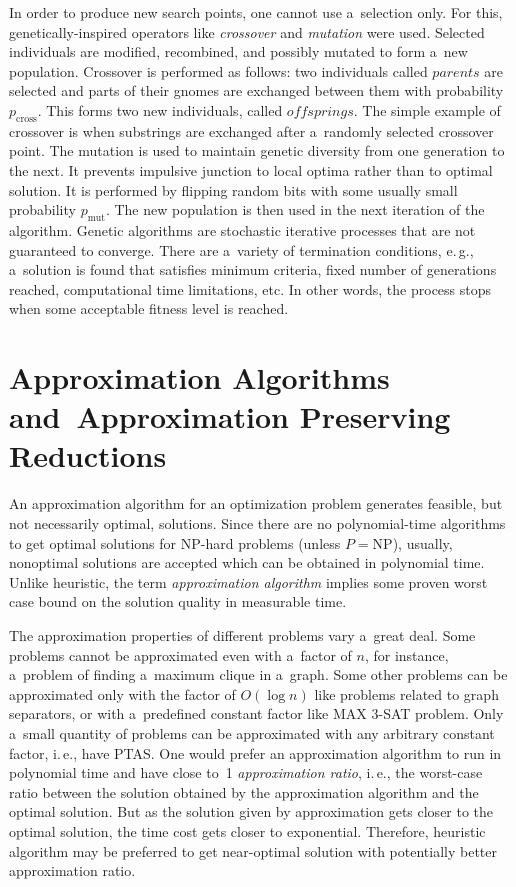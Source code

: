\begin{multicols}{2}
In order to produce new search points, one cannot use a~selection
only. For this, genetically-inspired operators like
\textit{crossover} and \textit{mutation} were used. Selected individuals are
modified, recombined, and possibly mutated to form a~new population.
Crossover is performed as follows: two individuals called
$\textit{parents}$ are selected and parts of their gnomes are
exchanged between them with probability $p_{\mathrm{cross}}$. This forms two
new individuals, called $\textit{offsprings}$. The simple example of
crossover is when substrings are exchanged after a~randomly selected
crossover point. The mutation is used to maintain genetic diversity
from one generation to the next. It prevents impulsive junction to
local optima rather than to optimal solution. It is performed by
flipping random bits with some usually small probability $p_{\mathrm{mut}}$.
The new population is then used in the next iteration of the
algorithm. Genetic algorithms are stochastic iterative processes
that are not guaranteed to converge. There are a~variety of
termination conditions, e.\,g., a~solution is found that satisfies
minimum criteria, fixed number of generations reached, computational
time limitations, etc. In other words, the process stops when some
acceptable fitness level is reached.

\section{Approximation Algorithms and~Approximation Preserving
Reductions} \label{s:AP}

\noindent
An approximation algorithm for an
optimization problem generates feasible, but not necessarily
optimal, solutions. Since there are no polynomial-time algorithms to
get optimal solutions for {NP}-hard problems (unless $P=\mathrm{NP}$),
usually, nonoptimal solutions are accepted which can be
obtained in polynomial time. Unlike heuristic, the term
\textit{approximation algorithm} implies some proven worst case
bound on the solution quality in measurable time.

The approximation properties of different problems vary a~great
deal. Some problems cannot be approximated even with a~factor of
$n$, for instance, a~problem of finding a~maximum clique in a~graph.
Some other problems can be approximated only with the factor of
$O(\log n)$ like problems related to graph separators, or with a~predefined constant factor like {MAX 3-SAT} problem. Only a~small quantity of problems can be approximated with any arbitrary
constant factor, i.\,e., have {PTAS}. One would prefer an
approximation algorithm to run in polynomial time and have close to~1 \textit{approximation ratio}, i.\,e., the worst-case ratio between
the solution obtained by the approximation algorithm and the optimal
solution. But as the solution given by approximation gets closer to
the optimal solution, the time cost gets closer to exponential.
Therefore, heuristic algorithm may be preferred
to get near-optimal solution with potentially better approximation ratio.


\end{multicols}

